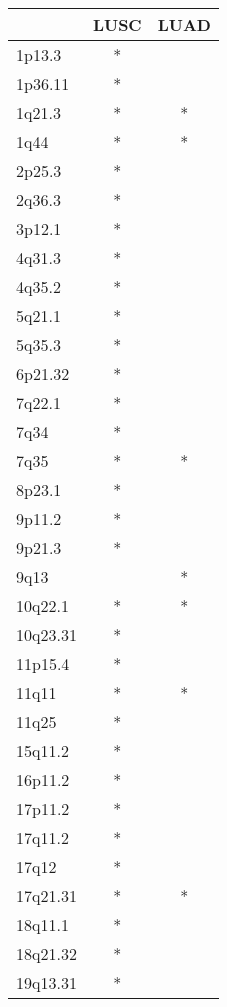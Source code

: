 \begin{tabular}{lcc}
\toprule
{} & LUSC & LUAD \\
\midrule
1p13.3   &    * &      \\
1p36.11  &    * &      \\
1q21.3   &    * &    * \\
1q44     &    * &    * \\
2p25.3   &    * &      \\
2q36.3   &    * &      \\
3p12.1   &    * &      \\
4q31.3   &    * &      \\
4q35.2   &    * &      \\
5q21.1   &    * &      \\
5q35.3   &    * &      \\
6p21.32  &    * &      \\
7q22.1   &    * &      \\
7q34     &    * &      \\
7q35     &    * &    * \\
8p23.1   &    * &      \\
9p11.2   &    * &      \\
9p21.3   &    * &      \\
9q13     &      &    * \\
10q22.1  &    * &    * \\
10q23.31 &    * &      \\
11p15.4  &    * &      \\
11q11    &    * &    * \\
11q25    &    * &      \\
15q11.2  &    * &      \\
16p11.2  &    * &      \\
17p11.2  &    * &      \\
17q11.2  &    * &      \\
17q12    &    * &      \\
17q21.31 &    * &    * \\
18q11.1  &    * &      \\
18q21.32 &    * &      \\
19q13.31 &    * &      \\
\bottomrule
\end{tabular}
